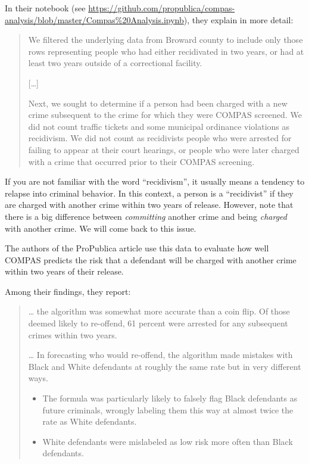 In their notebook (see
\url{https://github.com/propublica/compas-analysis/blob/master/Compas\%20Analysis.ipynb}),
they explain in more detail:

\begin{quote}
We filtered the underlying data from Broward county to include only
those rows representing people who had either recidivated in two years,
or had at least two years outside of a correctional facility.

{[}\ldots{]}

Next, we sought to determine if a person had been charged with a new
crime subsequent to the crime for which they were COMPAS screened. We
did not count traffic tickets and some municipal ordinance violations as
recidivism. We did not count as recidivists people who were arrested for
failing to appear at their court hearings, or people who were later
charged with a crime that occurred prior to their COMPAS screening.
\end{quote}

If you are not familiar with the word ``recidivism'', it usually means a
tendency to relapse into criminal behavior. In this context, a person is
a ``recidivist'' if they are charged with another crime within two years
of release. However, note that there is a big difference between
\emph{committing} another crime and being \emph{charged} with another
crime. We will come back to this issue.

The authors of the ProPublica article use this data to evaluate how well
COMPAS predicts the risk that a defendant will be charged with another
crime within two years of their release.

Among their findings, they report:

\begin{quote}
\ldots{} the algorithm was somewhat more accurate than a coin flip. Of
those deemed likely to re-offend, 61 percent were arrested for any
subsequent crimes within two years.

\ldots{} In forecasting who would re-offend, the algorithm made mistakes
with Black and White defendants at roughly the same rate but in very
different ways.

\begin{itemize}
\item
  The formula was particularly likely to falsely flag Black defendants
  as future criminals, wrongly labeling them this way at almost twice
  the rate as White defendants.
\item
  White defendants were mislabeled as low risk more often than Black
  defendants.
\end{itemize}
\end{quote}

